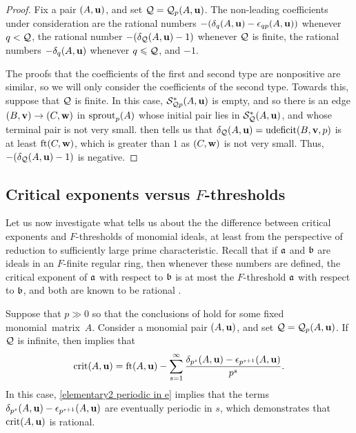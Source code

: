 \documentclass[11pt]{amsart}
\newcommand{\udeficit}{\operatorname{udeficit}}
\renewcommand{\S}{\mathcal{S}}
\begin{document}
\begin{proof}
   Fix a pair $(A,\mathbf{u})$, and set $\mathcal{Q}=\mathcal{Q}_p(A,\mathbf{u})$.
   The non-leading coefficients under consideration are the rational numbers $-(\delta_{q}(A,\mathbf{u})-\epsilon_{qp}(A,\mathbf{u}))$ whenever $q < \mathcal{Q}$, the rational number $-(\delta_{\mathcal{Q}}(A,\mathbf{u}) - 1)$ whenever $\mathcal{Q}$ is finite, the rational numbers $-\delta_q(A,\mathbf{u})$ whenever $q\leqslant \mathcal{Q}$, and $-1$.

   The proofs that the coefficients of the first and second type are nonpositive are similar, so we will only consider the coefficients of the second type.
   Towards this, suppose that $\mathcal{Q}$ is finite.
   In this case, $\S^{\ast}_{\Q p}(A,\vv{u})$ is empty, and so there is an edge $(B,\mathbf{v}) \to (C,\mathbf{w})$ in $\operatorname{sprout}_p(A)$ whose initial pair lies in $\S^{\ast}_{\Q}(A,\vv{u})$, and whose terminal pair is not very small.  then tells us that $\delta_{\Q}(A,\vv{u}) = \udeficit(B,\vv{v},p)$ is at least $\operatorname{ft}(C, \mathbf{w})$, which is greater than $1$ as $(C,\mathbf{w})$ is not very small.
   Thus, $-(\delta_{\mathcal{Q}}(A,\mathbf{u})-1)$ is negative.
\end{proof}

\subsection{Critical exponents versus $F$-thresholds}
\label{crit versus ft: SS}

Let us now investigate what  tells us about the the difference between critical exponents and $F$-thresholds of monomial ideals, at least from the perspective of reduction to sufficiently large prime characteristic.  
Recall that if $\mathfrak{a}$ and $\mathfrak{b}$ are ideals in an $F$-finite regular ring, then whenever these numbers are defined, the critical exponent of $\mathfrak{a}$ with respect to $\mathfrak{b}$ is at most the $F$-threshold $\mathfrak{a}$ with respect to $\mathfrak{b}$, and both are known to be rational \cite[Corollary~5.8]{hernandez+etal.frobenius_powers}.  

Suppose that $p \gg 0$ so that the conclusions of  hold for some fixed monomial~matrix~$A$.  Consider a monomial pair $(A,\mathbf{u})$, and set  $\mathcal{Q} = \mathcal{Q}_p(A,\mathbf{u})$.
If $\mathcal{Q}$ is infinite, then   implies that
%
\[ \operatorname{crit}(A,\mathbf{u})=\operatorname{ft}(A, \mathbf{u}) - \sum_{s=1}^{\infty} \frac{\delta_{p^s}(A,\mathbf{u})-\epsilon_{p^{s+1}}(A,\mathbf{u})}{p^s}. \] 
%
In this case, \eqref{elementary2 periodic in e} implies that the terms $\delta_{p^s}(A,\mathbf{u})-\epsilon_{p^{s+1}}(A,\mathbf{u})$ are eventually periodic in $s$, which demonstrates that $\operatorname{crit}(A,\mathbf{u})$ is rational.
\end{document}
